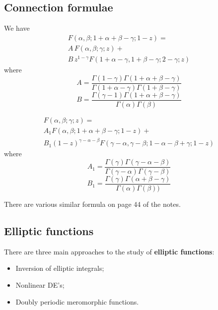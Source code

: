 \documentclass[10pt, oneside, reqno]{amsart}
\theoremstyle{plain}%
\theoremstyle{definition}
\theoremstyle{remark}
\begin{document}

\subsection{Connection formulae} %
\label{sub:connection_formulae}
We have \begin{align*}
	F(\alpha, \beta; 1 + \alpha + \beta - \gamma; 1 - z) = \\
	 A \,F(\alpha, \beta; \gamma ;z) + \\
	 B \, z^{1 - \gamma} F(1 + \alpha - \gamma, 1+ \beta - \gamma; 2 - \gamma; z)
\end{align*}
where \[
	A = \frac{\Gamma(1 - \gamma)\Gamma(1 + \alpha + \beta - \gamma)}{\Gamma(1 + \alpha - \gamma)\Gamma(1 + \beta - \gamma)}
\]\[
	B = \frac{\Gamma(\gamma - 1)\Gamma(1 + \alpha + \beta - \gamma)}{\Gamma(\alpha)\Gamma(\beta)}
\]

\begin{align*}
	F(\alpha, \beta; \gamma ; z) = \\
	A_1 F(\alpha, \beta; 1 + \alpha + \beta - \gamma; 1 -z) + \\
	 B_1 (1 - z)^{\gamma - \alpha - \beta} F(\gamma - \alpha, \gamma - \beta; 1 - \alpha - \beta + \gamma; 1 - z)	
\end{align*}
where \[
	A_1 = \frac{\Gamma(\gamma)\Gamma(\gamma - \alpha - \beta)}{\Gamma(\gamma - \alpha)\Gamma(\gamma - \beta)}
\]\[
	B_1 = \frac{\Gamma(\gamma)\Gamma(\alpha + \beta - \gamma)}{\Gamma(\alpha)\Gamma(\beta))}
\]

There are various similar formula on page 44 of the notes.


\subsection{Elliptic functions} %
\label{sec:elliptic_functions}

There are three main approaches to the study of \textbf{elliptic functions}:
\begin{itemize}
	\item Inversion of elliptic integrals;
	\item Nonlinear DE's;
	\item Doubly periodic meromorphic functions.
\end{itemize}
\end{document}
